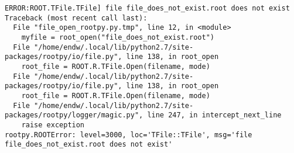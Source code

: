 \begin{footnotesize}
\begin{verbatim}
ERROR:ROOT.TFile.TFile] file file_does_not_exist.root does not exist
Traceback (most recent call last):
  File "file_open_rootpy.py.tmp", line 12, in <module>
    myfile = root_open("file_does_not_exist.root")
  File "/home/endw/.local/lib/python2.7/site-packages/rootpy/io/file.py", line 138, in root_open
    root_file = ROOT.R.TFile.Open(filename, mode)
  File "/home/endw/.local/lib/python2.7/site-packages/rootpy/io/file.py", line 138, in root_open
    root_file = ROOT.R.TFile.Open(filename, mode)
  File "/home/endw/.local/lib/python2.7/site-packages/rootpy/logger/magic.py", line 247, in intercept_next_line
    raise exception
rootpy.ROOTError: level=3000, loc='TFile::TFile', msg='file file_does_not_exist.root does not exist'
\end{verbatim}
\end{footnotesize}
